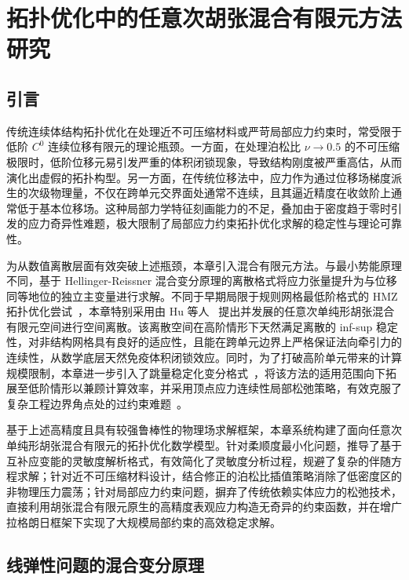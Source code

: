 \chapter{拓扑优化中的任意次胡张混合有限元方法研究}
\label{chap:hz_top}


\section{引言}
\label{sec:ch5_intro}

传统连续体结构拓扑优化在处理近不可压缩材料或严苛局部应力约束时，常受限于低阶 $C^0$ 连续位移有限元的理论瓶颈。一方面，在处理泊松比 $\nu \rightarrow 0.5$ 的不可压缩极限时，低阶位移元易引发严重的体积闭锁现象，导致结构刚度被严重高估，从而演化出虚假的拓扑构型。另一方面，在传统位移法中，应力作为通过位移场梯度派生的次级物理量，不仅在跨单元交界面处通常不连续，且其逼近精度在收敛阶上通常低于基本位移场。这种局部力学特征刻画能力的不足，叠加由于密度趋于零时引发的应力奇异性难题，极大限制了局部应力约束拓扑优化求解的稳定性与理论可靠性。

为从数值离散层面有效突破上述瓶颈，本章引入混合有限元方法。与最小势能原理不同，基于 Hellinger-Reissner 混合变分原理的离散格式将应力张量提升为与位移同等地位的独立主变量进行求解。不同于早期局限于规则网格最低阶格式的 HMZ 拓扑优化尝试~\cite{bruggiTopologyOptimizationMixed2016a}，本章特别采用由 Hu 等人~\cite{huFiniteElementApproximations2015} 提出并发展的任意次单纯形胡张混合有限元空间进行空间离散。该离散空间在高阶情形下天然满足离散的 inf-sup 稳定性，对非结构网格具有良好的适应性，且能在跨单元边界上严格保证法向牵引力的连续性，从数学底层天然免疫体积闭锁效应。同时，为了打破高阶单元带来的计算规模限制，本章进一步引入了跳量稳定化变分格式~\cite{chenStabilizedMixedFinite2017a}，将该方法的适用范围向下拓展至低阶情形以兼顾计算效率，并采用顶点应力连续性局部松弛策略，有效克服了复杂工程边界角点处的过约束难题~\cite{huPartialRelaxation02021a}。

基于上述高精度且具有较强鲁棒性的物理场求解框架，本章系统构建了面向任意次单纯形胡张混合有限元的拓扑优化数学模型。针对柔顺度最小化问题，推导了基于互补应变能的灵敏度解析格式，有效简化了灵敏度分析过程，规避了复杂的伴随方程求解；针对近不可压缩材料设计，结合修正的泊松比插值策略消除了低密度区的非物理压力震荡；针对局部应力约束问题，摒弃了传统依赖实体应力的松弛技术，直接利用胡张混合有限元原生的高精度表观应力构造无奇异的约束函数，并在增广拉格朗日框架下实现了大规模局部约束的高效稳定求解。


\section{线弹性问题的混合变分原理}
\label{sec:hz_variational_principle}

